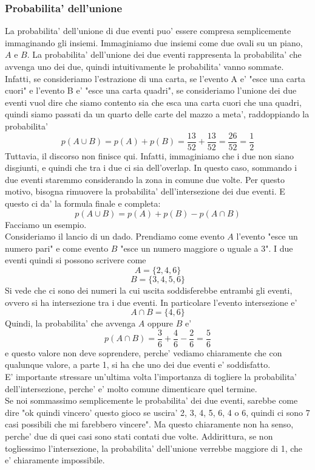 \documentclass[12pt]{article}
\begin{document}
\subsubsection{Probabilita' dell'unione}
La probabilita' dell'unione di due eventi puo' essere compresa semplicemente immaginando gli insiemi. Immaginiamo due insiemi come due ovali su un piano, $A$ e $B$. La probabilita' dell'unione dei due eventi rappresenta la probabilita' che avvenga uno dei due, quindi intuitivamente le probabilita' vanno sommate. \\
Infatti, se consideriamo l'estrazione di una carta, se l'evento A e' "esce una carta cuori" e l'evento B e' "esce una carta quadri", se consideriamo l'unione dei due eventi vuol dire che siamo contento sia che esca una carta cuori che una quadri, quindi siamo passati da un quarto delle carte del mazzo a meta', raddoppiando la probabilita'
$$
	p(A\cup B) = p(A) + p(B) = \frac{13}{52} + \frac{13}{52} = \frac{26}{52} = \frac{1}{2}
$$
Tuttavia, il discorso non finisce qui. Infatti, immaginiamo che i due non siano disgiunti, e quindi che tra i due ci sia dell'overlap. In questo caso, sommando i due eventi staremmo considerando la zona in comune due volte. Per questo motivo, bisogna rimuovere la probabilita' dell'intersezione dei due eventi. E questo ci da' la formula finale e completa:
$$
	p(A\cup B) = p(A) + p(B) - p(A \cap B)
$$
Facciamo un esempio. \\
Consideriamo il lancio di un dado. Prendiamo come evento $A$ l'evento "esce un numero pari" e come evento $B$ "esce un numero maggiore o uguale a 3". I due eventi quindi si possono scrivere come
$$
	A = \{2,4,6\}
$$
$$
	B = \{3,4,5,6\}
$$
Si vede che ci sono dei numeri la cui uscita soddisferebbe entrambi gli eventi, ovvero si ha intersezione tra i due eventi. In particolare l'evento intersezione e' 
$$
	A\cap B = \{4,6\}
$$
Quindi, la probabilita' che avvenga $A$ oppure $B$ e'
$$
	p(A\cap B) = \frac{3}{6} + \frac{4}{6} - \frac{2}{6} = \frac{5}{6}
$$
e questo valore non deve soprendere, perche' vediamo chiaramente che con qualunque valore, a parte 1, si ha che uno dei due eventi e' soddisfatto. \\
E' importante stressare un'ultima volta l'importanza di togliere la probabilita' dell'intersezione, perche' e' molto comune dimenticare quel termine. \\
Se noi sommassimo semplicemente le probabilita' dei due eventi, sarebbe come dire "ok quindi vincero' questo gioco se uscira' 2, 3, 4, 5, 6, 4 o 6, quindi ci sono 7 casi possibili che mi farebbero vincere". Ma questo chiaramente non ha senso, perche' due di quei casi sono stati contati due volte. Addirittura, se non togliessimo l'intersezione, la probabilita' dell'unione verrebbe maggiore di 1, che e' chiaramente impossibile.
\end{document}
